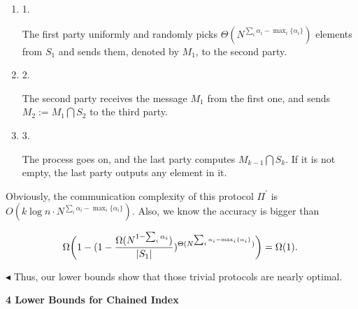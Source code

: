 \begin{enumerate}


\item[] 
1. 


The first party uniformly and randomly picks $\Theta(N^{\sum_{i}\alpha_{i}-\mathop{\max}_{i}\{\alpha_{i}\}})$ elements from $S_{1}$ and sends them, denoted by $M_{1}$, to the second party.\par





\item[] 
2. 


The second party receives the message $M_{1}$ from the first one, and sends $M_{2}:=M_{1}\bigcap S_{2}$ to the third party.\par





\item[] 
3. 


The process goes on, and the last party computes $M_{k-1}\bigcap S_{k}$. If it is not empty, the last party outputs any element in it.\par





\end{enumerate}




Obviously, the communication complexity of this protocol $\Pi^{\prime}$ is $O(k\log n\cdot N^{\sum_{i}\alpha_{i}-\mathop{\max}_{i}\{\alpha_{i}\}})$. Also, we know the accuracy is bigger than\par


\[\begin{gathered}
\Omega\bigg{(}1-(1-\frac{\Omega(N^{1-\sum_{i}\alpha_{i}})}{|S_{1}|})^{\Theta(N^{\sum_{i}\alpha_{i}-\mathop{\max}_{i}\{\alpha_{i}\}})}\bigg{)}=\Omega(1).\
\end{gathered}\]


$\blacktriangleleft$
Thus, our lower bounds show that those trivial protocols are nearly optimal.\par







\par\medskip\noindent\textbf{
4 Lower Bounds for Chained Index}\par




